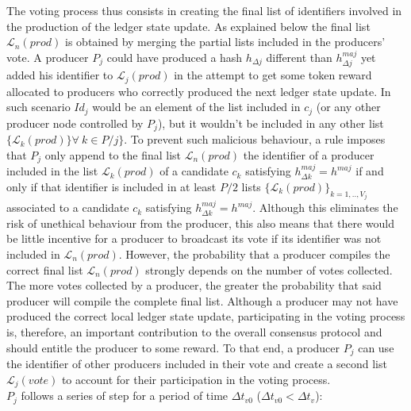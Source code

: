 The voting process thus consists in creating the final list of identifiers involved in the production of the ledger state update. As explained below the final list $\mathcal{L}_n(prod)$ is obtained by merging the partial lists included in the producers' vote. A producer $P_j$ could have produced a hash $h_{\Delta j}$ different than $h^{maj}_{\Delta j}$ yet added his identifier to $\mathcal{L}_j(prod)$ in the attempt to get some token reward allocated to producers who correctly produced the next ledger state update. In such scenario $Id_j$ would be an element of the list included in $c_j$ (or any other producer node controlled by $P_j$), but it wouldn't be included in any other list $\{\mathcal{L}_k(prod)\} \forall~k \in P/j\}$. To prevent such malicious behaviour, a rule imposes that $P_j$ only append to the final list $\mathcal{L}_n(prod)$ the identifier of a producer included in the list $\mathcal{L}_k(prod)$ of a candidate $c_k$ satisfying $h^{maj}_{\Delta k} = h^{maj}$ if and only if that identifier is included in at least $P/2$ lists $\{\mathcal{L}_{k}(prod)\}_{k=1,..,V_j}$ associated to a candidate $c_{k}$ satisfying $h^{maj}_{\Delta k} = h^{maj}$. Although this eliminates the risk of unethical behaviour from the producer, this also means that there would be little incentive for a producer to broadcast its vote if its identifier was not included in $\mathcal{L}_n(prod)$. However, the probability that a producer compiles the correct final list $\mathcal{L}_n(prod)$ strongly depends on the number of votes collected. The more votes collected by a producer, the greater the probability that said producer will compile the complete final list. Although a producer may not have produced the correct local ledger state update, participating in the voting process is, therefore, an important contribution to the overall consensus protocol and should entitle the producer to some reward. To that end, a producer $P_j$ can use the identifier of other producers included in their vote and create a second list $\mathcal{L}_j(vote)$ to account for their participation in the voting process. \\
 
$P_j$ follows a series of step for a period of time $\Delta t_{v0}$ ($\Delta t_{v0} < \Delta t_{v}$):

